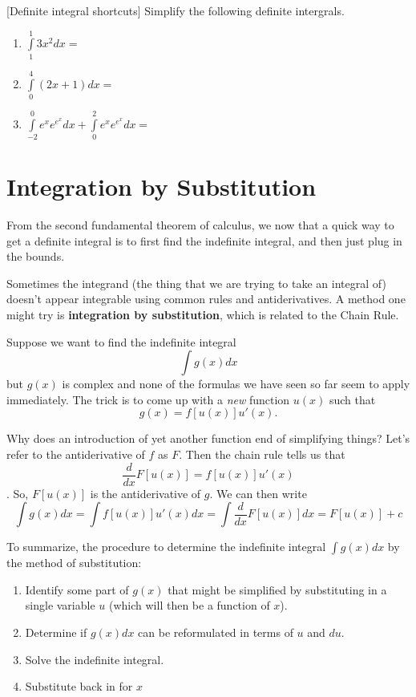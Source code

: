 \documentclass[]{book}
\providecommand{\tightlist}{%
  \setlength{\itemsep}{0pt}\setlength{\parskip}{0pt}}
\theoremstyle{definition}
\theoremstyle{definition}
\theoremstyle{definition}
\theoremstyle{remark}
\begin{document}
[Definite integral shortcuts]
\protect\hypertarget{exr:unnamed-chunk-30}{}{\label{exr:unnamed-chunk-30} {} }Simplify the following definite intergrals.

\begin{enumerate}
\def\labelenumi{\arabic{enumi}.}
\tightlist
\item
  \(\int\limits_1^1 3x^2 dx =\)
\item
  \(\int\limits_0^4 (2x+1)dx=\)
\item
  \(\int\limits_{-2}^0 e^x e^{e^x} dx + \int\limits_0^2 e^x e^{e^x} dx =\)
\end{enumerate}

\hypertarget{integration-by-substitution}{%
\section{Integration by Substitution}\label{integration-by-substitution}}

From the second fundamental theorem of calculus, we now that a quick way to get a definite integral is to first find the indefinite integral, and then just plug in the bounds.

Sometimes the integrand (the thing that we are trying to take an integral of) doesn't appear integrable using common rules and antiderivatives. A method one might try is \textbf{integration by substitution}, which is related to the Chain Rule.

Suppose we want to find the indefinite integral \[\int g(x)dx\] but \(g(x)\) is complex and none of the formulas we have seen so far seem to apply immediately. The trick is to come up with a \emph{new} function \(u(x)\) such that \[g(x)=f[u(x)]u'(x).\]

Why does an introduction of yet another function end of simplifying things? Let's refer to the antiderivative of \(f\) as \(F\). Then the chain rule tells us that \[\frac{d}{dx} F[u(x)]=f[u(x)]u'(x)\]. So, \(F[u(x)]\) is the antiderivative of \(g\). We can then write \[\int g(x) dx= \int f[u(x)]u'(x)dx = \int \frac{d}{dx} F[u(x)]dx = F[u(x)]+c\]

To summarize, the procedure to determine the indefinite integral \(\int g(x)dx\) by the method of substitution:

\begin{enumerate}
\def\labelenumi{\arabic{enumi}.}
\tightlist
\item
  Identify some part of \(g(x)\) that might be simplified by substituting in a single variable \(u\) (which will then be a function of \(x\)).
\item
  Determine if \(g(x)dx\) can be reformulated in terms of \(u\) and \(du\).
\item
  Solve the indefinite integral.
\item
  Substitute back in for \(x\)
\end{enumerate}
\end{document}
